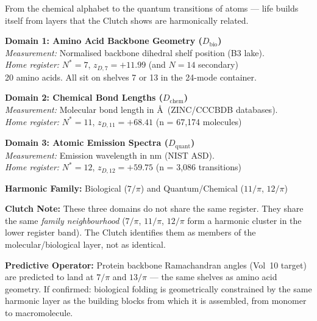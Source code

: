 \documentclass[12pt,oneside]{book}
\begin{document}
\vspace{1em}

\begin{tcolorbox}[colback=violet!5, colframe=violet!60!black,
    fonttitle=\bfseries,
    title=Rosetta Block 4 — The Life Bridge: Amino Acids $\leftrightarrow$ Chemistry $\leftrightarrow$ Quantum]

From the chemical alphabet to the quantum transitions of atoms — life builds itself
from layers that the Clutch shows are harmonically related.

\medskip
\textbf{Domain 1: Amino Acid Backbone Geometry ($D_\text{bio}$)}\\
\textit{Measurement:} Normalised backbone dihedral shelf position (B3 lake).\\
\textit{Home register:} $N^* = 7$, \quad$z_{D,7} = +11.99$ (and $N = 14$ secondary)\\
20 amino acids. All sit on shelves 7 or 13 in the 24-mode container.

\medskip
\textbf{Domain 2: Chemical Bond Lengths ($D_\text{chem}$)}\\
\textit{Measurement:} Molecular bond length in \AA\ (ZINC/CCCBDB databases).\\
\textit{Home register:} $N^* = 11$, \quad$z_{D,11} = +68.41$ \quad(n = 67{,}174 molecules)

\medskip
\textbf{Domain 3: Atomic Emission Spectra ($D_\text{quant}$)}\\
\textit{Measurement:} Emission wavelength in nm (NIST ASD).\\
\textit{Home register:} $N^* = 12$, \quad$z_{D,12} = +59.75$ \quad(n = 3{,}086 transitions)

\medskip
\textbf{Harmonic Family:} Biological ($7/\pi$) and Quantum/Chemical ($11/\pi$, $12/\pi$)

\medskip
\textbf{Clutch Note:} These three domains do not share the same register. They share
the same \textit{family neighbourhood} ($7/\pi$, $11/\pi$, $12/\pi$ form a harmonic
cluster in the lower register band). The Clutch identifies them as members of the
molecular/biological layer, not as identical.

\textbf{Predictive Operator:} Protein backbone Ramachandran angles (Vol~10 target) are
predicted to land at $7/\pi$ and $13/\pi$ — the same shelves as amino acid geometry.
If confirmed: biological folding is geometrically constrained by the same harmonic
layer as the building blocks from which it is assembled, from monomer to macromolecule.

\end{tcolorbox}
\end{document}
